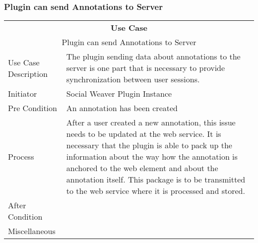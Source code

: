 \subsubsection[Client: Sending Annotations]{Plugin can send Annotations to Server}
\begin{tabular}{|l| p{6cm} |}
\hline 
 \multicolumn{2}{|c|}{\textbf{Use Case }} \\ 
 \multicolumn{2}{|c|}{Plugin can send Annotations to Server} \\ 
\hline 
Use Case Description & The plugin sending data about annotations to the server is one part that is necessary to provide synchronization between user sessions. \\ 
\hline 
Initiator & Social Weaver Plugin Instance \\ 
\hline 
Pre Condition & An annotation has been created \\ 
\hline 
Process & After a user created a new annotation, this issue needs to be updated at the web service. It is necessary that the plugin is able to pack up the information about the way how the annotation is anchored to the web element and about the annotation itself. This package is to be transmitted to the web service where it is processed and stored. \\ 
\hline 
After Condition &  \\ 
\hline 
Miscellaneous &  \\ 
\hline 
\end{tabular} 

